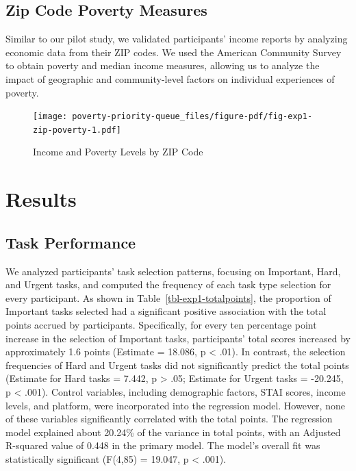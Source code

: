 \documentclass[
]{report}
\begin{document}
\begin{table}
\begin{minipage}[t]{\linewidth}
{}

\end{minipage}%

\end{table}

\hypertarget{zip-code-poverty-measures}{%
\subsection{Zip Code Poverty Measures}\label{zip-code-poverty-measures}}

Similar to our pilot study, we validated participants' income reports by
analyzing economic data from their ZIP codes. We used the American
Community Survey to obtain poverty and median income measures, allowing
us to analyze the impact of geographic and community-level factors on
individual experiences of poverty.

\begin{figure}

{\centering \texttt{[image: poverty-priority-queue\_files/figure-pdf/fig-exp1-zip-poverty-1.pdf]}

}

\caption{\label{fig-exp1-zip-poverty}Income and Poverty Levels by ZIP
Code}

\end{figure}

\hypertarget{results-1}{%
\section{Results}\label{results-1}}

\hypertarget{task-performance-1}{%
\subsection{Task Performance}\label{task-performance-1}}

We analyzed participants' task selection patterns, focusing on
Important, Hard, and Urgent tasks, and computed the frequency of each
task type selection for every participant. As shown in
Table~\ref{tbl-exp1-totalpoints}, the proportion of Important tasks
selected had a significant positive association with the total points
accrued by participants. Specifically, for every ten percentage point
increase in the selection of Important tasks, participants' total scores
increased by approximately 1.6 points (Estimate = 18.086, p \textless{}
.01). In contrast, the selection frequencies of Hard and Urgent tasks
did not significantly predict the total points (Estimate for Hard tasks
= 7.442, p \textgreater{} .05; Estimate for Urgent tasks = -20.245, p
\textless{} .001). Control variables, including demographic factors,
STAI scores, income levels, and platform, were incorporated into the
regression model. However, none of these variables significantly
correlated with the total points. The regression model explained about
20.24\% of the variance in total points, with an Adjusted R-squared
value of 0.448 in the primary model. The model's overall fit was
statistically significant (F(4,85) = 19.047, p \textless{} .001).
\end{document}
